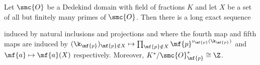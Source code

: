 \documentclass[12pt]{article}
\begin{document}
      \begin{proposition}\label{prop:ideal_class_group_localization_exact_sequence}
        Let \(\smc{O}\) be a Dedekind domain with field of fractions \(K\) and let \(X\) be a set of all but finitely many primes of \(\smc{O}\). Then there is a long exact sequence
        \begin{center}
        \end{center}
        induced by natural inclusions and projections and where the fourth map and fifth maps are induced by \((\k_{\mf{p}})_{\mf{p} \notin X} \mapsto \prod_{\mf{p} \notin X}\mf{p}^{v_{\mf{p}}(\k_{\mf{p}})}\) and \(\mf{a} \mapsto \mf{a}(X)\) respectively. Moreover, \(K^{\ast}/\smc{O}_{\mf{p}}^{\ast} \cong \Z\).
      \end{proposition}
\end{document}
